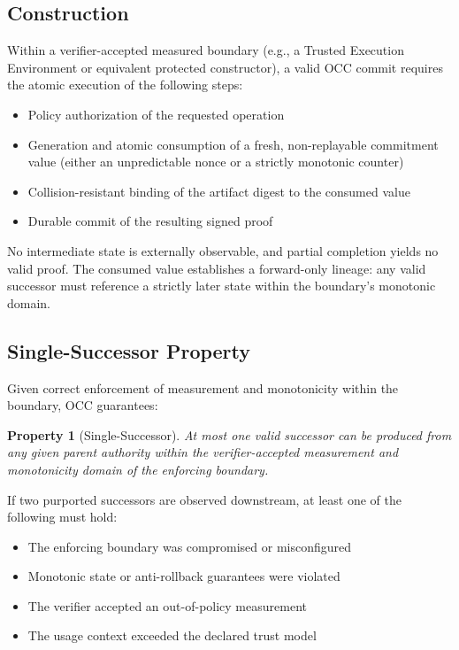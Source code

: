 \documentclass[11pt,letterpaper]{article}
\theoremstyle{occplain}
\theoremstyle{occremark}
\newtheorem{property}{Property}[section]
\begin{document}
\subsection{Construction}
\label{sec:bd-construction}

Within a verifier-accepted measured boundary (e.g., a Trusted Execution Environment or equivalent protected constructor), a valid OCC commit requires the atomic execution of the following steps:
\begin{itemize}
  \item Policy authorization of the requested operation
  \item Generation and atomic consumption of a fresh, non-replayable commitment value (either an unpredictable nonce or a strictly monotonic counter)
  \item Collision-resistant binding of the artifact digest to the consumed value
  \item Durable commit of the resulting signed proof
\end{itemize}

No intermediate state is externally observable, and partial completion yields no valid proof. The consumed value establishes a forward-only lineage: any valid successor must reference a strictly later state within the boundary's monotonic domain.


\subsection{Single-Successor Property}
\label{sec:bd-single-successor}

Given correct enforcement of measurement and monotonicity within the boundary, OCC guarantees:

\begin{property}[Single-Successor]
\label{prop:single-successor}
At most one valid successor can be produced from any given parent authority within the verifier-accepted measurement and monotonicity domain of the enforcing boundary.
\end{property}

If two purported successors are observed downstream, at least one of the following must hold:
\begin{itemize}
  \item The enforcing boundary was compromised or misconfigured
  \item Monotonic state or anti-rollback guarantees were violated
  \item The verifier accepted an out-of-policy measurement
  \item The usage context exceeded the declared trust model
\end{itemize}
\end{document}
